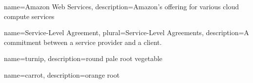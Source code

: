 {
    name={Amazon Web Services},
    description={Amazon's offering for various cloud compute services}
}





{
    name={Service-Level Agreement},
    plural={Service-Level Agreements},
    description={A commitment between a service provider and a client.}
}

{
    name={turnip},
    description={round pale root vegetable}
}

{
    name={carrot},
    description={orange root}
}

